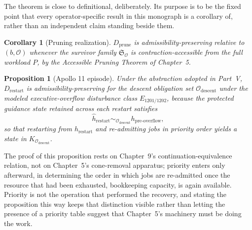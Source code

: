 \documentclass[11pt]{report}
\newtheorem{proposition}[definition]{Proposition}
\newtheorem{corollary}[definition]{Corollary}
\begin{document}
The theorem is close to definitional, deliberately. Its purpose is to be the fixed point that every operator-specific result in this monograph is a corollary of, rather than an independent claim standing beside them.

\begin{corollary}[Pruning realization]
$D_{\mathrm{prune}}$ is admissibility-preserving relative to $(b, \mathcal O)$ whenever the survivor family $\mathfrak S_{\mathcal O}$ is contraction-accessible from the full workload $P$, by the Accessible Pruning Theorem of Chapter~5.
\end{corollary}

\begin{proposition}[Apollo 11 episode]
Under the abstraction adopted in Part~V, $D_{\mathrm{restart}}$ is admissibility-preserving for the descent obligation set $\mathcal O_{\mathrm{descent}}$ under the modeled executive-overflow disturbance class $E_{1201/1202}$, because the protected guidance state retained across each restart satisfies
\[
\widehat h_{\mathrm{restart}} \sim_{\mathcal O_{\mathrm{descent}}} h_{\mathrm{pre\text{-}overflow}},
\]
so that restarting from $\widehat h_{\mathrm{restart}}$ and re-admitting jobs in priority order yields a state in $K_{\mathcal O_{\mathrm{descent}}}$.
\end{proposition}

The proof of this proposition rests on Chapter~9's continuation-equivalence relation, not on Chapter~5's cone-removal apparatus; priority enters only afterward, in determining the order in which jobs are re-admitted once the resource that had been exhausted, bookkeeping capacity, is again available. Priority is not the operation that performed the recovery, and stating the proposition this way keeps that distinction visible rather than letting the presence of a priority table suggest that Chapter~5's machinery must be doing the work.
\end{document}
